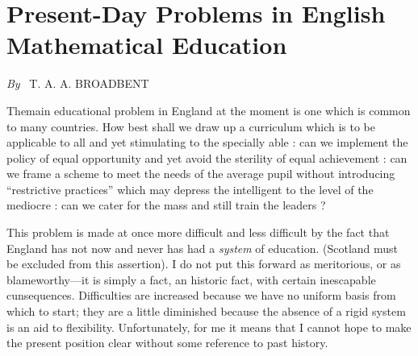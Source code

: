 \chapter{Present-Day Problems in English Mathematical Education}

\begin{center}
  {\em By}~ T. A. A. BROADBENT
\end{center}

\medskip

\setcounter{pageoriginal}{56}
The\pageoriginale main educational problem in England at the moment is one which is common to many countries. How best shall we draw up a curriculum which is to be applicable to all and yet stimulating to the specially able : can we implement the policy of equal opportunity and yet avoid the sterility of equal achievement : can we frame a scheme to meet the needs of the average pupil without introducing ``restrictive practices'' which may depress the intelligent to the level of the mediocre : can we cater for the mass and still train the leaders ?

This problem is made at once more difficult and less difficult by the fact that England has not now and never has had a {\em system} of education. (Scotland must be excluded from this assertion). I do not put this forward as meritorious, or as blameworthy---it is simply a fact, an historic fact, with certain inescapable cunsequences. Difficulties are increased because we have no uniform basis from which to start; they are a little diminished because the absence of a rigid system is an aid to flexibility. Unfortunately, for me it means that I cannot hope to make the present position clear without some reference to past history.

